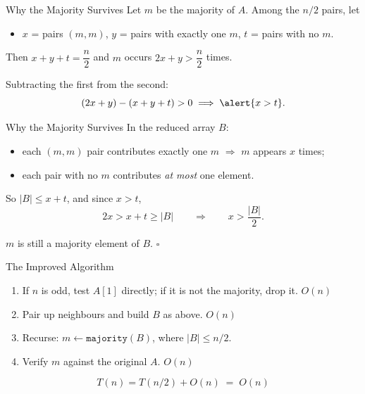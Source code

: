 \documentclass[10pt,aspectratio=169]{beamer}
\begin{document}
\begin{frame}{Why the Majority Survives}
  Let $m$ be the majority of $A$. Among the $n/2$ pairs, let
  \begin{itemize}
    \item $x$ = pairs $(m,m)$, \quad $y$ = pairs with exactly one $m$, \quad $t$ = pairs with no $m$.
  \end{itemize}

  \pause

  \bigskip
  Then $x + y + t = \dfrac{n}{2}$ and $m$ occurs $2x + y > \dfrac{n}{2}$ times.

  \pause
  \bigskip
  Subtracting the first from the second:
  \[
    (2x + y) - (x + y + t) > 0 \;\Longrightarrow\; \alert{x > t}.
  \]
\end{frame}

\begin{frame}{Why the Majority Survives}
  In the reduced array $B$:
  \begin{itemize}
    \item each $(m,m)$ pair contributes exactly one $m$ \; $\Rightarrow$ \; $m$ appears $x$ times;
    \item each pair with no $m$ contributes \emph{at most} one element.
  \end{itemize}

  \bigskip
  So $|B| \le x + t$, and since $x > t$,
  \[
    2x > x + t \ge |B|
    \qquad\Longrightarrow\qquad
    x > \frac{|B|}{2}.
  \]

  \bigskip
  \begin{center}
    $m$ is still a majority element of $B$. $\square$
  \end{center}
\end{frame}

\begin{frame}{The Improved Algorithm}
  \begin{enumerate}
    \item If $n$ is odd, test $A[1]$ directly; if it is not the majority, drop it. \hfill $O(n)$
    \bigskip
    \item Pair up neighbours and build $B$ as above. \hfill $O(n)$
    \bigskip
    \item Recurse: $m \leftarrow \texttt{majority}(B)$, where $|B| \le n/2$.
    \bigskip
    \item Verify $m$ against the \alert{original} $A$. \hfill $O(n)$
  \end{enumerate}

  \bigskip
  \begin{alertblock}{}
    \[
      T(n) = T(n/2) + O(n) \;=\; O(n)
    \]
  \end{alertblock}
\end{frame}
\end{document}
